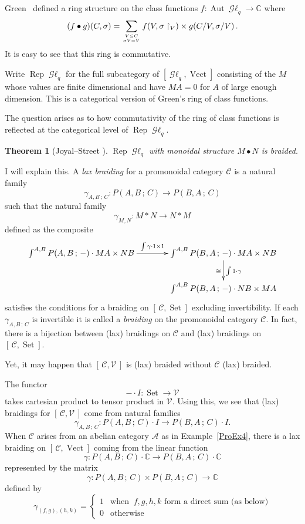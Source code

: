 \documentclass[a4paper,12pt]{article}
\newtheorem*{Theorem}{Theorem}%
\theoremstyle{definition}
\theoremstyle{fact}
\theoremstyle{genquest}
\theoremstyle{step}
\newcommand{\catA}{\mathcal{A}}
\newcommand{\Aut}{\operatorname{Aut}}
\newcommand{\catC}{\mathcal{C}}
\newcommand{\CC}{\mathbb{C}}
\newcommand{\catGL}{\mathop{\mathcal{G}\ell}\nolimits}
\newcommand{\Rep}{\operatorname{Rep}}
\newcommand{\Set}{\operatorname{Set}}
\newcommand{\catV}{\mathcal{V}}
\newcommand{\Vect}{\operatorname{Vect}}
\newcommand{\longto}{\longrightarrow}
\begin{document}
\noindent
Green~\cite{Green1955} defined a ring structure on the class functions $f: \Aut\catGL_q \to \CC$ where
\[
(f \bullet g) (C,\sigma) = \sum_{V \leq C \atop \sigma V = V} f(V,\sigma \upharpoonright_V) \times g (C/V,\sigma/V)\,.
\]
It is easy to see that this ring is commutative.


Write $\Rep\catGL_q$ for the full subcategory of $[\catGL_q,\Vect]$ consisting of the $M$ whose values are finite dimensional and have $MA = 0$ for $A$ of  large enough dimension. This is a categorical version of Green's ring of class functions.

\medskip

The question arises as to how commutativity of the ring of class functions is reflected at the categorical level of $\Rep\catGL_q$.
%
\begin{Theorem}[Joyal--Street \cite{GLFq}]
$\Rep\catGL_q$ with monoidal structure $M\bullet N$ is braided.
\end{Theorem}

\noindent
I will explain this. A \emph{lax braiding} for a promonoidal category $\catC$ is a natural family
\[
\gamma^{}_{A,B\,;\,C} : P(A,B\,;\,C) \longto P(B,A\,;\,C)
\]
such that the natural family
\[
\gamma^{}_{M,N} : M \ast N \longto N \ast M
\]
defined as the composite
\[ \xymatrix @C+5mm{
\int^{A,B} P(A,B\,;\,-)  \cdot   MA \times NB    \ar[r]^{\int \gamma \cdot  1 \times 1}
 & \int^{A,B} P(B,A\,;\,-)  \cdot MA \times NB   \ar[d]_\cong^{\int 1 \cdot \gamma}
\\
& \int^{A,B} P(B,A\,;\,-)  \cdot NB \times MA
}\]
satisfies the conditions for a braiding on $[\,\catC, \Set ]$ excluding invertibility.    
If each $\gamma^{}_{A,B\,;\,C}$ is invertible it is called a \emph{braiding} on the promonoidal category $\catC$.    
In fact, there is a bijection between (lax) braidings on $\catC$ and (lax) braidings on $[\,\catC,\Set ]$.

Yet, it may happen that $[\,\catC,\catV\,]$ is (lax) braided without $\catC$ (lax) braided.

\noindent
The functor
\[
-  \cdot  I : \Set  \longto \catV
\]
takes cartesian product to tensor product in $\catV$. 
Using this, we see that (lax) braidings for $[\,\catC,\catV\,]$ come from natural families
\[
\gamma^{}_{A,B\,;\,C} : P(A,B\,;\,C)   \cdot I \longto
P (B,A\,;\,C) \cdot  I.
\]
When $\catC$ arises from an abelian category $\catA$ as in Example~\ref{ProEx4}, 
there is a lax braiding on $[\,\catC, \Vect]$ coming from the linear function
\[
\gamma : P(A,B\,;\,C) \cdot  \CC   \longto  P(B,A\,;\,C) \cdot  \CC 
\]
represented by the matrix
\[
\gamma : P (A,B\,;\,C) \times P(B,A\,;\,C) \longto \CC 
\]
defined by
\[
\gamma^{}_{(f,g),(h,k)}   = \begin{cases}
1 & \text{when } \ f,g,h,k \text{ form a direct sum (as below)}
\\
0 & \text{otherwise}
\end{cases}
\]
\end{document}
